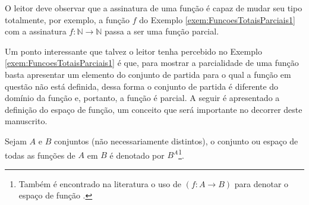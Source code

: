 \begin{remark}
	O leitor deve observar que a assinatura de uma função é capaz de mudar seu tipo totalmente, por exemplo, a função $f$ do Exemplo \ref{exem:FuncoesTotaisParciais1} com a assinatura $f: \mathbb{N} \rightarrow \mathbb{N}$ passa a ser uma função parcial.
\end{remark}

Um ponto interessante que talvez o leitor tenha percebido no Exemplo \ref{exem:FuncoesTotaisParciais1} é que, para mostrar a parcialidade de uma função basta apresentar um elemento do conjunto de partida para o qual a função em questão não está definida, dessa forma o conjunto de partida é diferente do domínio da função e, portanto, a função é parcial. A seguir é apresentado a definição do espaço de função, um conceito que será importante no decorrer deste manuscrito.

\begin{definition}
	Sejam $A$ e $B$ conjuntos (não necessariamente distintos), o conjunto ou espaço de todas as funções de $A$ em $B$ é denotado por $B^A$\footnote{Também é encontrado na literatura o uso de $(f: A \rightarrow B)$ para denotar o espaço de função \cite{fmcbook}.}.
\end{definition}